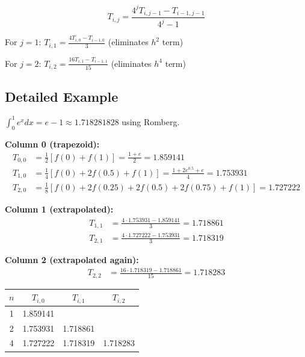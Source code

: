 
\begin{equation}
    \boxed{T_{i,j} = \frac{4^j T_{i,j-1} - T_{i-1,j-1}}{4^j - 1}}
\end{equation}

For $j = 1$: $T_{i,1} = \frac{4 T_{i,0} - T_{i-1,0}}{3}$ (eliminates $h^2$ term)

For $j = 2$: $T_{i,2} = \frac{16 T_{i,1} - T_{i-1,1}}{15}$ (eliminates $h^4$ term)


\subsection{Detailed Example}

 $\int_0^1 e^x dx = e - 1 \approx 1.718281828$ using Romberg.

\textbf{Column 0 (trapezoid):}
\begin{align*}
    T_{0,0} &= \frac{1}{2}[f(0) + f(1)] = \frac{1 + e}{2} = 1.859141 \\
    T_{1,0} &= \frac{1}{4}[f(0) + 2f(0.5) + f(1)] = \frac{1 + 2e^{0.5} + e}{4} = 1.753931 \\
    T_{2,0} &= \frac{1}{8}[f(0) + 2f(0.25) + 2f(0.5) + 2f(0.75) + f(1)] = 1.727222
\end{align*}

\textbf{Column 1 (extrapolated):}
\begin{align*}
    T_{1,1} &= \frac{4 \cdot 1.753931 - 1.859141}{3} = 1.718861 \\
    T_{2,1} &= \frac{4 \cdot 1.727222 - 1.753931}{3} = 1.718319
\end{align*}

\textbf{Column 2 (extrapolated again):}
\begin{align*}
    T_{2,2} &= \frac{16 \cdot 1.718319 - 1.718861}{15} = 1.718283
\end{align*}

\begin{center}
\begin{tabular}{c|ccc}
$n$ & $T_{i,0}$ & $T_{i,1}$ & $T_{i,2}$ \\
\hline
1 & 1.859141 & & \\
2 & 1.753931 & 1.718861 & \\
4 & 1.727222 & 1.718319 & 1.718283 \\
\end{tabular}
\end{center}

